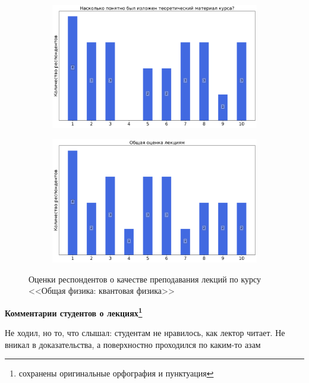 \begin{figure}[H]
\begin{subfigure}[b]{0.45\textwidth}
                \end{subfigure}
                \begin{subfigure}[b]{0.45\textwidth}
                    \centering
                    \includegraphics[width=\textwidth]{images/3 course/Общая физика - квантовая физика/lecturer-marks-Кобякин А.С.-2.png}
                \end{subfigure}	
                \begin{subfigure}[b]{0.45\textwidth}
                    \centering
                    \includegraphics[width=\textwidth]{images/3 course/Общая физика - квантовая физика/lecturer-marks-Кобякин А.С.-3.png}
                \end{subfigure}
                \caption{Оценки респондентов о качестве преподавания лекций по курсу <<Общая физика: квантовая физика>>}
            \end{figure}

            \textbf{Комментарии студентов о лекциях\protect\footnote{сохранены оригинальные орфография и пунктуация}}
                \begin{commentbox} 
                    Не ходил, но то, что слышал: студентам не нравилось, как лектор читает. Не вникал в доказательства, а поверхностно проходился по каким-то азам 
                \end{commentbox} 
            
